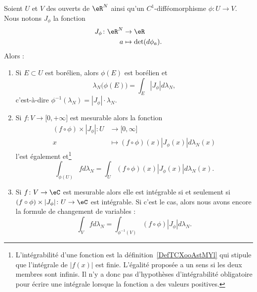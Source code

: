 \begin{theorem}         \label{THOooUMIWooZUtUSg}
	Soient \( U\) et \( V\) des ouverts de \( \eR^N\) ainsi qu'un \( C^1\)-difféomorphisme \(\phi\colon U\to V\). Nous notons \( J_{\phi}\) la fonction
	\begin{equation}
		\begin{aligned}
			J_{\phi}\colon \eR^N & \to \eR                \\
			a                    & \mapsto \det(d\phi_a).
		\end{aligned}
	\end{equation}
	Alors :
	\begin{enumerate}
		\item   \label{ItemVWYDooOzwnyfi}
		      Si \( E\subset U\) est borélien, alors \( \phi(E)\) est borélien et
		      \begin{equation}
			      \lambda_N\big( \phi(E) \big)=\int_E| J_{\phi} |d\lambda_N,
		      \end{equation}
		      c'est-à-dire \( \phi^{-1}(\lambda_N)=| J_{\phi} |\cdot \lambda_N\).
		\item       \label{ITEMooEZUBooGBuDOS}
		      Si \( f\colon V\to \mathopen[ 0 , +\infty \mathclose]\) est mesurable alors la fonction
		      \begin{equation}
			      \begin{aligned}
				      (f\circ\phi)\times | J_{\phi} |\colon U & \to \mathopen[ 0 , \infty \mathclose]                \\
				      x                                       & \mapsto  (f\circ\phi)(x)| J_{\phi}(x) |d\lambda_N(x)
			      \end{aligned}
		      \end{equation}
		      l'est également et\footnote{L'intégrabilité d'une fonction est la définition~\ref{DefTCXooAstMYl} qui stipule que l'intégrale de \( | f(x) |\) est finie. L'égalité proposée a un sens si les deux membres sont infinis. Il n'y a donc pas d'hypothèses d'intégrabilité obligatoire pour écrire une intégrale lorsque la fonction a des valeurs positives.}
		      \begin{equation}        \label{EqRANEooQsFhbC}
			      \int_{\phi(U)}fd\lambda_N=\int_U(f\circ\phi)(x)| J_{\phi}(x) |d\lambda_N(x).
		      \end{equation}
		\item       \label{ITEMooAJGDooGHKnvj}
		      Si \( f\colon V\to \eC\) est mesurable alors elle est intégrable si et seulement si \( (f\circ \phi)\times | J_{\phi} |\colon U\to \eC\) est intégrable. Si c'est le cas, alors nous avons encore la formule de changement de variables :
		      \begin{equation}        \label{EQooLYAWooTArAZR}
			      \int_{V}fd\lambda_N=\int_{\phi^{-1}(V)} (f\circ \phi)| J_{\phi} |d\lambda_N.
		      \end{equation}
	\end{enumerate}
\end{theorem}


